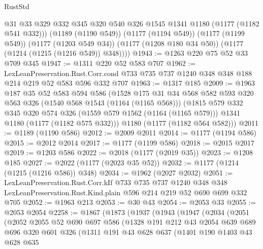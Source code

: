 \begin{lexlean}{RustStd}
\begin{coremodule}
{\begin{coremodule}
{{{{{          @31
          @33
          @329
          @332
          @345
          @320
          @540
          @326
          @1545
          @1341
          @1180
          (@1177 (@1182 @541 @332)))
        (@1189 (@1190 @549))
        (@1177 (@1194 @549))
        (@1177 (@1199 @549))
        (@1177 (@1203 @549 @34))
        (@1177 (@1208 @180 @34 @50))
        (@1177 (@1214 (@1215 (@1216 @549)) @348))))
@1943 := @1263 @220 @75 @52 @33 @709 @345
@1947 := @1311 @220 @52 @583 @707
@1962 := LexLeanPreservation.Rust.Corr.cond
    @733
    @735
    @737
    @1240
    @348
    @348
    @188
    @214
    @219
    @52
    @583
    @596
    @332
    @707
@1963 := @1317 @185
@2009 := @1963
    @187
    @35
    @52
    @583
    @594
    @586
    (@1528
      @175
      @31
      @34
      @568
      @582
      @593
      @320
      @563
      @326
      (@1540 @568 @1543 (@1164 (@1165 @568)))
      (@1815
        @579
        @332
        @345
        @320
        @574
        @326
        (@1559 @579 @1562 (@1164 (@1165 @579)))
        @1341
        @1180
        (@1177 (@1182 @575 @332)))
      @1180
      (@1177 (@1182 @564 @582)))
@2011 := @1189 (@1190 @586)
@2012 := @2009 @2011
@2014 := @1177 (@1194 @586)
@2015 := @2012 @2014
@2017 := @1177 (@1199 @586)
@2018 := @2015 @2017
@2019 := @1203 @586
@2022 := @2018 (@1177 (@2019 @35))
@2023 := @1208 @185
@2027 := @2022 (@1177 (@2023 @35 @52))
@2032 := @1177 (@1214 (@1215 (@1216 @586)) @348)
@2034 := @1962 (@2027 @2032)
@2051 := LexLeanPreservation.Rust.Corr.kIf
    @733
    @735
    @737
    @1240
    @348
    @348
    LexLeanPreservation.Rust.Kind.plain
    @596
    @214
    @219
    @52
    @690
    @699
    @332
    @705
@2052 := @1963 @213
@2053 := @30 @43
@2054 := @2053 @33
@2055 := @2053 @2054
@2258 := @1867
    (@1873
      (@1937
        (@1943
          (@1947
            (@2034
              (@2051
                (@2052
                  @2055
                  @52
                  @690
                  @697
                  @586
                  (@1328
                    @191
                    @212
                    @43
                    @2054
                    @639
                    @689
                    @696
                    @320
                    @601
                    @326
                    (@1311
                      @191
                      @43
                      @628
                      @637
                      (@1401
                        @190
                        @1403
                        @43
                        @628
                        @635
}}}}}
\end{coremodule}}
\end{coremodule}
\end{lexlean}
